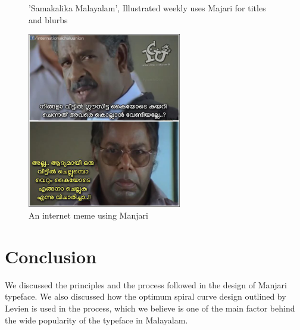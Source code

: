 \documentclass[11pt,twoside,a4paper,parskip=half]{scrartcl}
\begin{document}
\begin{figure}[h!]
\begin{subfigure}[b]{.45\textwidth}
	\end{subfigure}

	\caption{'Samakalika Malayalam', Illustrated weekly uses Majari for titles and blurbs}
	\label{manjari-sample-3}
\end{figure}

\begin{figure}[h!]
	\includegraphics[width=0.6\textwidth]{images/manjari-sample-4.png}
	\caption{An internet meme using Manjari}
	\label{manjari-sample-4}
\end{figure}

\clearpage
\section{Conclusion}

We discussed the principles and the process followed in the design of Manjari typeface. We also discussed how the optimum spiral curve design outlined by Levien is used in the process, which we believe is one of the main factor behind the wide popularity of the typeface in Malayalam.


{}
\end{document}
